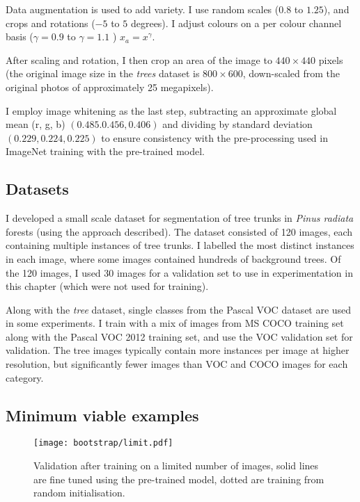 Data augmentation is used to add variety. I use random scales ($0.8$ to $1.25$), and crops and rotations ($-5$ to $5$ degrees). I adjust colours on a per colour channel basis ($ \gamma = 0.9 $ to $ \gamma=1.1 $ )  $ x_a = x^{\gamma} $.

After scaling and rotation, I then crop an area of the image to $440 \times 440$ pixels (the original image size in the \emph{trees} dataset is $800 \times 600$, down-scaled from the original photos of approximately 25 megapixels).

I employ image whitening as the last step, subtracting an approximate global mean (r, g, b) $ (0.485. 0.456, 0.406) $ and dividing by standard deviation $ (0.229, 0.224, 0.225) $  to ensure consistency with the pre-processing used in ImageNet training with the pre-trained model.



\subsection {Datasets}




I developed a small scale dataset for segmentation of tree trunks in \emph{Pinus radiata} forests (using the approach described). The dataset consisted of 120 images, each containing multiple instances of tree trunks. I labelled the most distinct instances in each image, where some images contained hundreds of background trees. Of the 120 images, I used 30 images for a validation set to use in experimentation in this chapter (which were not used for training).

Along with the \emph{tree} dataset, single classes from the Pascal VOC dataset are used in some experiments. I train with a mix of images from MS COCO \cite{Lin2014} training set along with the Pascal VOC 2012 training set, and use the VOC validation set for validation. The tree images typically contain more instances per image at higher resolution, but significantly fewer images than VOC and COCO images for each category.


\subsection {Minimum viable examples}

\begin{figure}[ht!]

  
\centering
\texttt{[image: bootstrap/limit.pdf]}
\caption {Validation after training on a limited number of images, solid lines are fine tuned using the pre-trained model, dotted are training from random initialisation. }
\label{fig:bootstrap_limited}

\bigskip
\end{figure}


